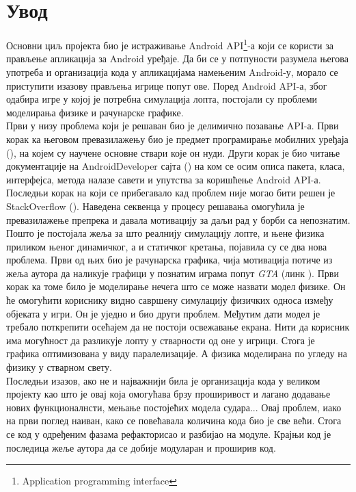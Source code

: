 
\chapter{Увод}
Основни циљ пројекта био је истраживање Android API\footnote{Application programming interface}-а који се користи за прављење апликација за Android уређаје. Да би се у потпуности разумела његова употреба и организација кода у апликацијама намењеним Android-у, морало се приступити изазову прављења игрице попут ове. Поред Android API-а, због одабира игре у којој је потребна симулација лопта, постојали су проблеми моделирања физике и рачунарске графике. 
\\ \indent Први у низу проблема који је решаван био је делимично позавање API-а. Први корак ка његовом превазилажењу био је предмет програмирање мобилних уређаја (\cite{PMU}), на којем су научене основне ствари које он нуди. Други корак је био читање документације на AndroidDeveloper сајта (\cite{AndroidDeveloper}) на ком се осим описа пакета, класа, интерфејса, метода налазе савети и упутства за коришћење Android API-а. Последњи корак на који се прибегавало кад проблем није могао бити решен је StackOverflow (\cite{StackOverflow}). Наведена секвенца у процесу решавања омогућила је превазилажење препрека и давала мотивацију за даљи рад у борби са непознатим.
\\ \indent Пошто је постојала жеља за што реалнију симулацију лопте, и њене физика приликом њеног динамичког, а и статичког кретања, појавила су се два нова проблема. Први од њих био је рачунарска графика, чија мотивација  потиче из жеља аутора да наликује графици у познатим играма попут \emph{GTA} (линк \cite{GTA}). Први корак ка томе било је моделирање нечега што се може назвати модел физике. Он ће омогућити кориснику видно савршену симулацију физичких односа између објеката у игри. Он је уједно и био други проблем. Међутим дати модел је требало поткрепити осећајем да не постоји освежавање екрана. Нити да корисник има могућност да разликује лопту у стварности од оне у игрици. Стога је графика оптимизована у виду паралелизације. А физика моделирана по угледу на физику у стварном свету. 
\\ \indent Последњи изазов, ако не и најважнији била је организација кода у великом пројекту као што је овај која омогућава брзу проширивост и лагано додавање нових функционалнсти, мењање постојећих модела судара... Овај проблем, иако на први поглед наиван, како се повећавала количина кода био је све већи. Стога се код у одређеним фазама рефакторисао и разбијао на модуле. Крајњи код је последица жеље аутора да се добије модуларан и проширив код. 

